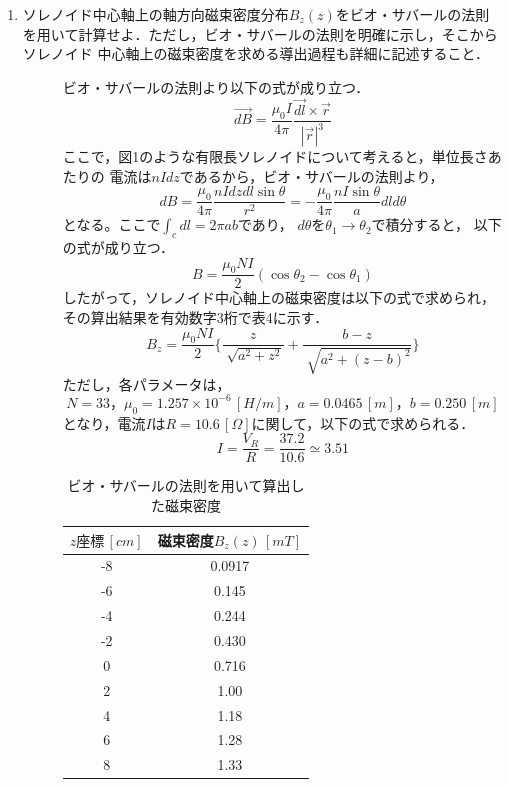 \begin{enumerate}
    \newpage

    \item ソレノイド中心軸上の軸方向磁束密度分布$B_z(z)$をビオ・サバールの法則
    を用いて計算せよ．ただし，ビオ・サバールの法則を明確に示し，そこからソレノイド
    中心軸上の磁束密度を求める導出過程も詳細に記述すること．
    \begin{description}
        \item[] ビオ・サバールの法則より以下の式が成り立つ．
        $$
        \vec{dB}=\frac{\mu_0 I}{4\pi}\frac{\vec{dl}\times\vec{r}}{|\vec{r}|^3}
        $$
        ここで，図1のような有限長ソレノイドについて考えると，単位長さあたりの
        電流は$nIdz$であるから，ビオ・サバールの法則より，
        $$
        dB=\frac{\mu_0}{4\pi}\frac{nIdzdl\sin\theta}{r^2}=-\frac{\mu_0}{4\pi}\frac{nI\sin\theta}{a}dld\theta
        $$
        となる。ここで$\int_{c}dl=2\pi ab$であり，
        $d\theta$を$\theta_1 \rightarrow \theta_2$で積分すると，
        以下の式が成り立つ．
        $$
        B=\frac{\mu_0 NI}{2}(\cos\theta_2 - \cos\theta_1)
        $$
        したがって，ソレノイド中心軸上の磁束密度は以下の式で求められ，
        その算出結果を有効数字3桁で表4に示す．
        $$
        B_z=\frac{\mu_0 NI}{2}\{\frac{z}{\sqrt[]{a^2+z^2}}+\frac{b-z}{\sqrt[]{a^2+(z-b)^2}}\}
        $$
        ただし，各パラメータは，
        $$
        N=33，\mu_0=1.257\times 10^{-6}\,[\si{H/m}]，a=0.0465\,[\si{m}]，b=0.250\,[\si{m}]
        $$
        となり，電流$I$は$R=10.6\,[\si{\Omega}]$に関して，以下の式で求められる．
        $$
        I=\frac{V_R}{R}=\frac{37.2}{10.6}\simeq 3.51
        $$
        \begin{table}[H]
            \centering
            \caption{ビオ・サバールの法則を用いて算出した磁束密度}
            \begin{tabular}{c|c}
            \hline
                $z座標\,[\si{cm}]$ & 磁束密度$B_z(z)\,[\si{mT}]$ \\ \hline
                -8 & 0.0917 \\ 
                -6 & 0.145 \\ 
                -4 & 0.244 \\ 
                -2 & 0.430 \\ 
                0 & 0.716 \\ 
                2 & 1.00 \\ 
                4 & 1.18 \\ 
                6 & 1.28 \\ 
                8 & 1.33 \\ 

\end{tabular}
\end{table}
\end{description}
\end{enumerate}

